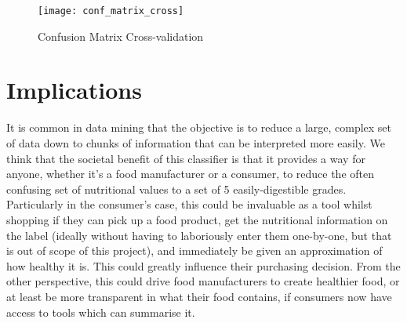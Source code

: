 \documentclass[journal]{IEEEtran}
\begin{document}
\begin{figure}[ht]
\centering
\texttt{[image: conf\_matrix\_cross]}
\caption{Confusion Matrix Cross-validation}
\label{fig:cnf_crossvalidation}
\end{figure}

\section{Implications}

It is common in data mining that the objective is to reduce a large, complex set of data down to chunks of information that can be interpreted more easily. We think that the societal benefit of this classifier is that it provides a way for anyone, whether it’s a food manufacturer or a consumer, to reduce the often confusing set of nutritional values to a set of 5 easily-digestible grades. Particularly in the consumer’s case, this could be invaluable as a tool whilst shopping if they can pick up a food product, get the nutritional information on the label (ideally without having to laboriously enter them one-by-one, but that is out of scope of this project), and immediately be given an approximation of how healthy it is. This could greatly influence their purchasing decision. From the other perspective, this could drive food manufacturers to create healthier food, or at least be more transparent in what their food contains, if consumers now have access to tools which can summarise it.




%
%
\end{document}
